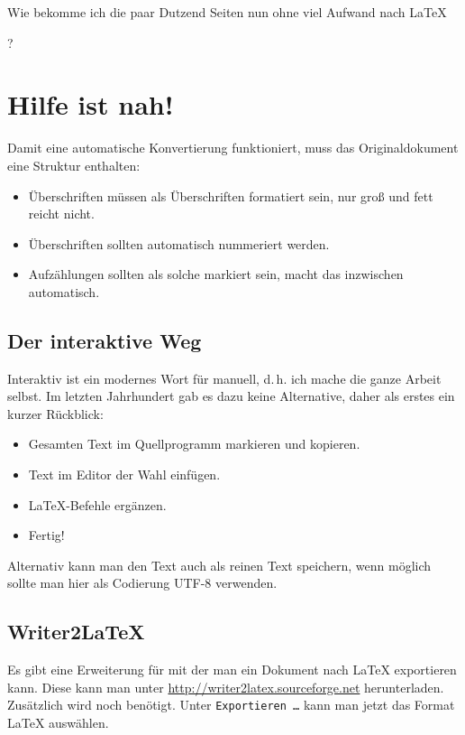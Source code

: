 Wie bekomme ich die paar Dutzend Seiten nun ohne viel Aufwand nach \LaTeX{{}?

\section{Hilfe ist nah!}

Damit eine automatische Konvertierung funktioniert, muss das Originaldokument eine Struktur enthalten:

\begin{itemize}
\item Überschriften müssen als Überschriften formatiert sein, nur groß und fett reicht nicht.
\item Überschriften sollten automatisch nummeriert werden.
\item Aufzählungen sollten als solche markiert sein,  macht das inzwischen automatisch.
\end{itemize}

\subsection{Der interaktive Weg}

Interaktiv ist ein modernes Wort für manuell, d.\,h. ich mache die ganze Arbeit selbst. 
Im letzten Jahrhundert gab es dazu keine Alternative, daher als erstes ein kurzer Rückblick:

\begin{itemize}
\item Gesamten Text im Quellprogramm markieren und kopieren.
\item Text im Editor der Wahl einfügen.
\item \LaTeX{}-Befehle ergänzen.
\item Fertig!
\end{itemize}

Alternativ kann man den Text auch als reinen Text speichern, wenn möglich sollte man hier als Codierung UTF-8 verwenden.

\subsection{Writer2LaTeX}

Es gibt eine Erweiterung für  mit der man ein Dokument nach \LaTeX{} exportieren kann.
Diese kann man unter \url{http://writer2latex.sourceforge.net} herunterladen.
Zusätzlich wird noch  benötigt.
Unter \texttt{Exportieren \dots} kann man jetzt das Format \LaTeX{} auswählen.

}
